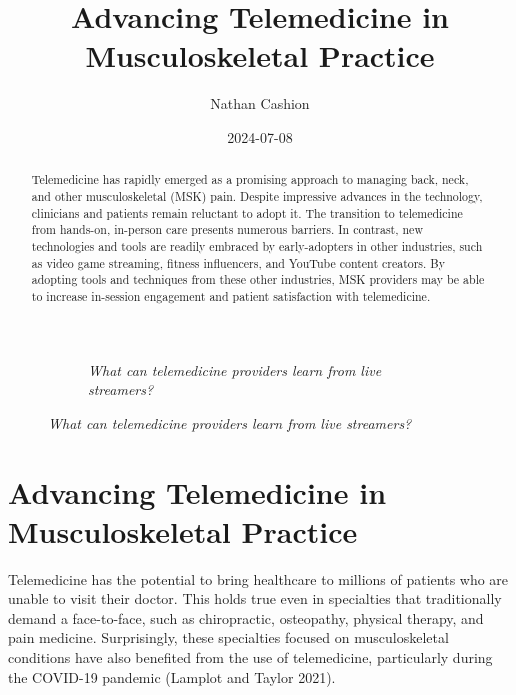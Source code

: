 \documentclass[
  letterpaper,
  DIV=11,
  numbers=noendperiod,
  oneside]{scrartcl}
\title{Advancing Telemedicine in Musculoskeletal Practice}
\author{Nathan Cashion}
\date{2024-07-08}
\makeatletter
\newcommand*\pandocbounded[1]{%
  \sbox\pandoc@box{#1}%
  \Gscale@div\@tempa{\textheight}{\dimexpr\ht\pandoc@box+\dp\pandoc@box\relax}%
  \Gscale@div\@tempb{\linewidth}{\wd\pandoc@box}%
  \ifdim\@tempb\p@<\@tempa\p@\let\@tempa\@tempb\fi%
  \ifdim\@tempa\p@<\p@\scalebox{\@tempa}{\usebox\pandoc@box}%
  \else\usebox{\pandoc@box}%
  \fi%
}
\renewcommand*\contentsname{Table of contents}
\newcommand\contentsname{Table of contents}
\makeatother
\begin{document}
\maketitle
\begin{abstract}
Telemedicine has rapidly emerged as a promising approach to managing
back, neck, and other musculoskeletal (MSK) pain. Despite impressive
advances in the technology, clinicians and patients remain reluctant to
adopt it. The transition to telemedicine from hands-on, in-person care
presents numerous barriers. In contrast, new technologies and tools are
readily embraced by early-adopters in other industries, such as video
game streaming, fitness influencers, and YouTube content creators. By
adopting tools and techniques from these other industries, MSK providers
may be able to increase in-session engagement and patient satisfaction
with telemedicine.
\end{abstract}

\renewcommand*\contentsname{Table of contents}
{
\hypersetup{linkcolor=}
\setcounter{tocdepth}{3}
\tableofcontents
}

\begin{figure}

\begin{figure}[H]

{\centering \pandocbounded{\texttt{[image: 3 Broadcast Setup.png]}}

}

\caption{\emph{What can telemedicine providers learn from live
streamers?}}

\end{figure}%

\end{figure}%

\section{Advancing Telemedicine in Musculoskeletal
Practice}\label{advancing-telemedicine-in-musculoskeletal-practice}

Telemedicine has the potential to bring healthcare to millions of
patients who are unable to visit their doctor. This holds true even in
specialties that traditionally demand a face-to-face, such as
chiropractic, osteopathy, physical therapy, and pain medicine.
Surprisingly, these specialties focused on musculoskeletal conditions
have also benefited from the use of telemedicine, particularly during
the COVID-19 pandemic (Lamplot and Taylor 2021).
\end{document}
